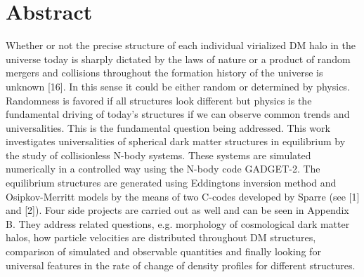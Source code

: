 \section*{Abstract}
Whether or not the precise structure of each individual virialized DM halo in the universe today is sharply dictated by the laws of nature or a product of random mergers and collisions throughout the formation history of the universe is unknown [16].
In this sense it could be either random or determined by physics. Randomness is favored if all structures look different but physics is the fundamental driving of today's structures if we can observe common trends and universalities. This is the fundamental question being addressed. This work investigates universalities of spherical dark matter structures in equilibrium by the study of collisionless N-body systems. These systems are simulated numerically in a controlled way using the N-body code GADGET-2. The equilibrium structures are generated using Eddingtons inversion method and Osipkov-Merritt models by the means of two C-codes developed by Sparre (see [1] and [2]). Four side projects are carried out as well and can be seen in Appendix B. They address related questions, e.g. morphology of cosmological dark matter halos, how particle velocities are distributed throughout DM structures, comparison of simulated and observable quantities and finally looking for universal features in the rate of change of density profiles for different structures. 